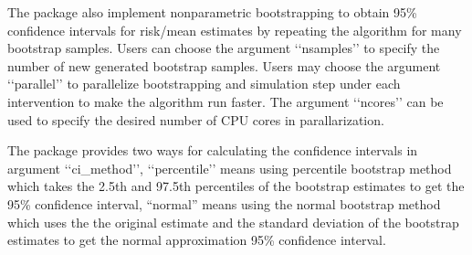 \documentclass[letterpaper,10pt,english]{sphinxmanual}
\begin{document}
\sphinxAtStartPar
The package also implement nonparametric bootstrapping to obtain 95\% confidence intervals for risk/mean estimates
by repeating the algorithm for many bootstrap samples. Users can choose the argument ‘‘nsamples’’ to specify the number of new generated bootstrap samples.
Users may choose the argument ‘‘parallel’’ to parallelize bootstrapping and simulation step under each intervention to
make the algorithm run faster. The argument ‘‘ncores’’ can be used to specify the desired number of CPU cores
in parallarization.

\sphinxAtStartPar
The package provides two ways for calculating the confidence intervals
in argument ‘‘ci\_method’’, ‘‘percentile’’ means using percentile bootstrap method which takes the 2.5th and 97.5th percentiles of the bootstrap estimates to get the 95\% confidence interval,
“normal” means using the normal bootstrap method which uses the the original estimate and
the standard deviation of the bootstrap estimates to get the normal approximation 95\% confidence interval.
\end{document}
